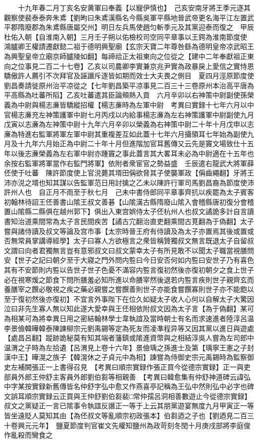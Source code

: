 　　十九年春二月丁亥名安黄軍曰奉義【以寵伊慎也】　己亥安南牙將王季元逐其觀察使裴泰泰奔朱鳶【劉昫曰朱鳶漢縣名今縣吳軍平縣地晉武帝更名海平江左置武平郡隋廢郡為朱鳶縣唐屬交州】明日左兵馬使趙匀斬季元及其黨迎泰而復之　甲辰杜佑入朝【自淮南入朝】三月壬子朔以佑檢校司空同平章事以王鍔為淮南節度使　鴻臚卿王權請遷獻懿二祖于德明興聖廟【玄宗天寶二年尊咎繇為德明皇帝凉武昭王為興聖皇帝立廟京師臚陵如翻】每禘祫正太祖東向之位從之【建中二年奉獻祖正東向之位事見二百二十七卷】乙亥以司農卿李實兼京兆尹實為政暴戾上愛信之實恃恩驕傲許人薦引不次拜官及誣譖斥逐皆如期而效士大夫畏之側目　夏四月涇原節度使劉昌奏請徙原州治平凉從之【七年劉昌築平凉事見二百三十三卷原州本治高平唐為平高縣為吐蕃所䧟】乙亥吐蕃遣其臣論頰熱入貢　六月辛卯以右神策中尉副使孫榮義為中尉與楊志亷皆驕縱招權【楊志亷時為左軍中尉　考異曰實録十七年六月以中官楊志亷充左神策護軍中尉七月丙戍以内給事楊志亷為左右神策護軍中尉副使九月戊寅以志亷為左神策中尉十九年六月辛卯以榮義為右神策中尉二十年十月戊申以志亷為特進右監軍將軍左軍中尉其重複差互如此蓋十七年六月攝領耳七年始為副使九月及十九年六月始正為中尉二十年十月但進階加官耳舊傳又云先是竇文場致仕十五年以後志亷榮義為左右軍中尉亦踵竇之事此蓋言其大畧耳未必為中尉適在十五年也　余按右監軍將軍當作右監門將軍】依附者衆宦官之勢益盛　壬辰遣右龍武大將軍薛伾使于吐蕃　陳許節度使上官涚薨其壻田偁欲脅其子使襲軍政【偁齒繩翻】牙將王沛亦涚之壻也知其謀以告監軍范日用討擒之乙未以陳許行軍司馬劉昌裔為節度使沛許州人也　自正月不雨至于秋七月　己未中書侍郎同平章事齊抗以疾罷為太子賓客　初翰林待詔王伾善書山隂王叔文善碁【山隂漢古縣隋廢山隂入會稽縣唐初復分會稽置山隂縣二縣俱在越州郭下】俱出入東宫娯侍太子伾杭州人也叔文譎詭多計自言讀書知治道乘間常為太子言民間疾苦【譎古宂翻治直吏翻乘間古莧翻為于偽翻】太子嘗與諸侍讀及叔文等論及宫市事【太宗時晉王府有侍讀及為太子亦置焉其後或置或否無常員掌講導經學】太子曰寡人方欲極言之衆皆稱贊獨叔文無言既退太子自留叔文謂曰向者君獨無言豈有意邪叔文曰叔文蒙幸太子有所見敢不以聞太子職當視膳問安【世子之記曰朝夕至于大寢之門外問内䜿曰今日安否何如内䜿曰安世子乃有喜色其有不安節則内䜿以告世子世子色憂不滿容内䜿言復初然後亦復初朝夕之食上世子必在視寒煖之節食下問所膳羞必知所進以命膳宰然後退若内䜿言疾則世子親齊玄而養膳宰之饌必敬視之疾之藥必親嘗之嘗饌善則世子亦能食嘗饌寡則世子亦不能飽以至于復初然後亦復初】不宜言外事陛下在位久如疑太子收人心何以自解太子大驚因泣曰非先生寡人無以知此遂大愛幸與王伾相依附叔文因為太子言【為于偽翻】某可為相某可為將幸異日用之密結翰林學士韋執誼及當時朝士有名而求速進者陸淳呂温李景儉韓曄韓泰陳諫柳宗元劉禹錫等定為死友而凌凖程异等又因其黨以進日與遊處【處昌呂翻】蹤跡詭秘莫有知其端者藩鎮或隂進資幣與之相結淳吳人嘗為左司郎中温渭之子時為左拾遺【呂渭見上卷十六年】景儉瑀之孫進士及第【瑀寧王憲之子封漢中王】曄滉之族子【韓滉休之子貞元中為相】諫嘗為侍御史宗元禹錫時為監察御史左補闕張正一上書得召見　【考異曰順宗實録作張正買今從德宗實録】正一與吏部員外郎王仲舒主客員外郎劉伯芻等相親善　【考異曰韓愈集有仲舒神道碑云諱弘中字某按實録新舊傳皆名仲舒字弘中愈又作燕喜亭記稱為王弘中然則弘中必字也碑文誤耳順宗實録云正買與王仲舒劉伯芻裴□常仲孺呂洞相善數遊止今從德宗實録】叔文之黨疑正一言已隂事令執誼反譖正一等于上云其朋黨遊宴無度九月甲寅正一等皆坐遠貶人莫知其由【為伾叔文等亂順宗初政張本】伯芻迺之子也【劉迺見二百三十卷興元元年】　鹽夏節度判官崔文先權知鹽州為政苛刻冬閏十月庚戌部將李庭俊作亂殺而臠食之